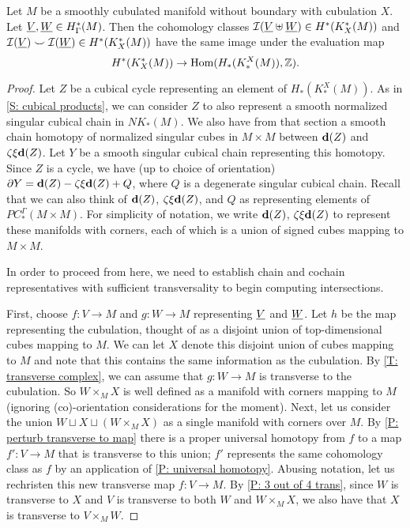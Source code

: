 \documentclass{amsart}
\begin{document}
\begin{proposition}
Let $M$ be a smoothly cubulated manifold without boundary with cubulation $X$. Let $\underline{V},\underline{W}\in H^*_\Gamma(M)$. Then the cohomology classes $\mathcal{I}(\underline{V}\uplus\underline{W})\in H^*(K_X^*(M))$ and $\mathcal{I}(\underline{V}) \smile \mathcal{I}(\underline{W})\in H^*(K_X^*(M))$ have the same image under the evaluation map $$H^*(K_X^*(M))\to \textup{Hom}(H_*(K_*^X(M)),\mathbb{Z}).$$ 
\end{proposition}

\begin{proof}
Let $Z$ be a cubical cycle representing an element of $H_*(K_*^X(M))$. As in \cref{S: cubical products}, we can consider $Z$ to also represent a smooth normalized singular cubical chain in $NK_*(M)$. We also have from that section a smooth chain homotopy of normalized singular cubes  in $M\times M$ between $\mathbf{d}(Z)$ and $\zeta\xi\mathbf{d}(Z)$. Let $Y$ be a smooth singular cubical chain representing this homotopy. Since $Z$ is a cycle, we have (up to choice of orientation) $\partial Y=\mathbf{d}(Z)-\zeta\xi\mathbf{d}(Z)+Q$, where $Q$ is a degenerate singular cubical chain. Recall that we can also think of $\mathbf{d}(Z)$, $\zeta\xi\mathbf{d}(Z)$, and $Q$ as representing elements of $PC^\Gamma_*(M\times M)$. For simplicity of notation, we write $\mathbf{d}(Z)$, $\zeta\xi\mathbf{d}(Z)$ to represent these manifolds with corners, each of which is a union of signed cubes mapping to $M\times M$. 

In order to proceed from here, we need to establish chain and cochain representatives with sufficient transversality to begin computing intersections. 

First, choose $f:V\to M$ and $g:W\to M$ representing $\underline{V}$ and $\underline{W}$. Let $h$ be the map representing the cubulation, thought of as a disjoint union of top-dimensional cubes mapping to $M$. We can let $X$ denote this disjoint union of cubes mapping to $M$ and note that this contains the same information as the cubulation. By \cref{T: transverse complex}, we can assume that $g:W\to M$ is transverse to the cubulation. So $W\times_MX$ is well defined as a manifold with corners mapping to $M$ (ignoring (co)-orientation considerations for the moment). 
Next, let us consider the union $W\sqcup X\sqcup (W\times_M X)$ as a single manifold with corners over $M$. By \cref{P: perturb transverse to map} there is a proper universal homotopy from $f$ to a map $f':V\to M$ that is transverse to this union; $f'$ represents the same cohomology class as $f$ by an application of \cref{P: universal homotopy}. Abusing notation, let us rechristen this new transverse map $f:V\to M$.  By \cref{P: 3 out of 4 trans}, since $W$ is transverse to $X$ and $V$ is transverse to both $W$ and $W\times_MX$, we also have that $X$ is transverse to $V\times_M W$. 


\end{proof}
\end{document}
